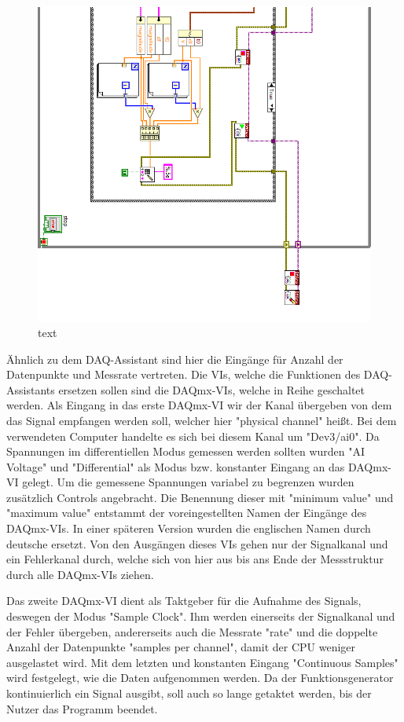 		\begin{figure}[H]
			\centering
			\includegraphics[width=\textwidth]{pic/messstruktur2.png}	
			\caption{text}
			\label{fig:messstruktur}
		\end{figure}
		
		\thispagestyle{plain}
		Ähnlich zu dem DAQ-Assistant sind hier die Eingänge für Anzahl der Datenpunkte und Messrate vertreten.
		Die VIs, welche die Funktionen des DAQ-Assistants ersetzen sollen sind die DAQmx-VIs, welche in Reihe geschaltet werden.
		Als Eingang in das erste DAQmx-VI wir der Kanal übergeben von dem das Signal empfangen werden soll, welcher hier "physical channel" heißt.
		Bei dem verwendeten Computer handelte es sich bei diesem Kanal um "Dev3/ai0".
		Da Spannungen im differentiellen Modus gemessen werden sollten wurden "AI Voltage" und "Differential" als Modus bzw. konstanter Eingang an das DAQmx-VI gelegt. 
		Um die gemessene Spannungen variabel zu begrenzen wurden zusätzlich Controls angebracht.
		Die Benennung dieser mit "minimum value" und "maximum value" entstammt der voreingestellten Namen der Eingänge des DAQmx-VIs.
		In einer späteren Version wurden die englischen Namen durch deutsche ersetzt.
		Von den Ausgängen dieses VIs gehen nur der Signalkanal und ein Fehlerkanal durch, welche sich von hier aus bis ans Ende der Messstruktur durch alle DAQmx-VIs ziehen.
		
		Das zweite DAQmx-VI dient als Taktgeber für die Aufnahme des Signals, deswegen der Modus "Sample Clock".
		Ihm werden einerseits der Signalkanal und der Fehler übergeben, andererseits auch die Messrate "rate" und die doppelte Anzahl der Datenpunkte "samples per channel", damit der CPU weniger ausgelastet wird. 
		Mit dem letzten und konstanten Eingang "Continuous Samples" wird festgelegt, wie die Daten aufgenommen werden.
		Da der Funktionsgenerator kontinuierlich ein Signal ausgibt, soll auch so lange getaktet werden, bis der Nutzer das Programm beendet.
		

